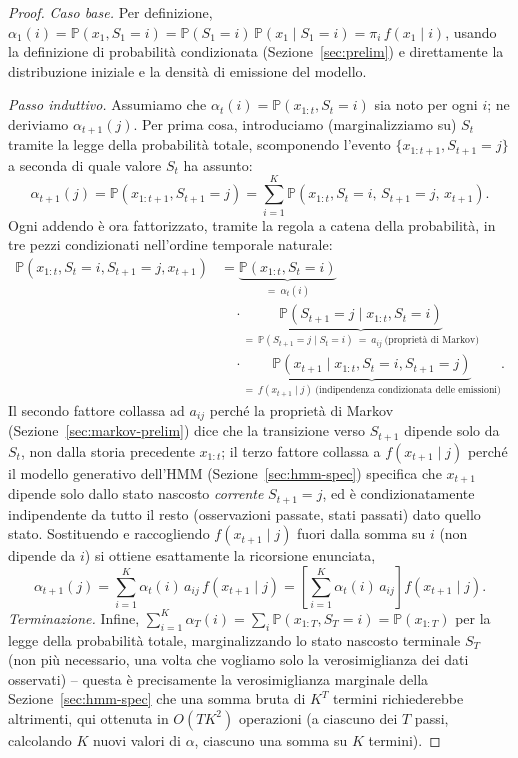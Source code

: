 \documentclass[11pt]{article}
\theoremstyle{definition}
\theoremstyle{remark}
\begin{document}
\begin{proof}
\emph{Caso base.} Per definizione, $\alpha_1(i)=\mathbb{P}(x_1,S_1=i)=\mathbb{P}(S_1=i)\,\mathbb{P}(x_1\mid S_1=i)=\pi_i\,f(x_1\mid i)$, usando la definizione di probabilit\`a condizionata (Sezione~\ref{sec:prelim}) e direttamente la distribuzione iniziale e la densit\`a di emissione del modello.

\emph{Passo induttivo.} Assumiamo che $\alpha_t(i)=\mathbb{P}(x_{1:t},S_t=i)$ sia noto per ogni $i$; ne deriviamo $\alpha_{t+1}(j)$. Per prima cosa, introduciamo (marginalizziamo su) $S_t$ tramite la legge della probabilit\`a totale, scomponendo l'evento $\{x_{1:t+1},S_{t+1}=j\}$ a seconda di quale valore $S_t$ ha assunto:
\[
\alpha_{t+1}(j) = \mathbb{P}(x_{1:t+1},S_{t+1}=j) = \sum_{i=1}^K \mathbb{P}(x_{1:t},S_t=i,\,S_{t+1}=j,\,x_{t+1}).
\]
Ogni addendo \`e ora fattorizzato, tramite la regola a catena della probabilit\`a, in tre pezzi condizionati nell'ordine temporale naturale:
\begin{align*}
\mathbb{P}(x_{1:t},S_t=i,S_{t+1}=j,x_{t+1})
&= \underbrace{\mathbb{P}(x_{1:t},S_t=i)}_{=\ \alpha_t(i)}\\
&\quad\cdot\underbrace{\mathbb{P}(S_{t+1}=j\mid x_{1:t},S_t=i)}_{=\ \mathbb{P}(S_{t+1}=j\mid S_t=i)\ =\ a_{ij}\ \text{(propriet\`a di Markov)}}\\
&\quad\cdot\underbrace{\mathbb{P}(x_{t+1}\mid x_{1:t},S_t=i,S_{t+1}=j)}_{=\ f(x_{t+1}\mid j)\ \text{(indipendenza condizionata delle emissioni)}}.
\end{align*}
Il secondo fattore collassa ad $a_{ij}$ perch\'e la propriet\`a di Markov (Sezione~\ref{sec:markov-prelim}) dice che la transizione verso $S_{t+1}$ dipende solo da $S_t$, non dalla storia precedente $x_{1:t}$; il terzo fattore collassa a $f(x_{t+1}\mid j)$ perch\'e il modello generativo dell'HMM (Sezione~\ref{sec:hmm-spec}) specifica che $x_{t+1}$ dipende solo dallo stato nascosto \emph{corrente} $S_{t+1}=j$, ed \`e condizionatamente indipendente da tutto il resto (osservazioni passate, stati passati) dato quello stato. Sostituendo e raccogliendo $f(x_{t+1}\mid j)$ fuori dalla somma su $i$ (non dipende da $i$) si ottiene esattamente la ricorsione enunciata,
\[
\alpha_{t+1}(j) = \sum_{i=1}^K\alpha_t(i)\,a_{ij}\,f(x_{t+1}\mid j) = \left[\sum_{i=1}^K\alpha_t(i)\,a_{ij}\right]f(x_{t+1}\mid j).
\]
\emph{Terminazione.} Infine, $\sum_{i=1}^K\alpha_T(i)=\sum_i\mathbb{P}(x_{1:T},S_T=i)=\mathbb{P}(x_{1:T})$ per la legge della probabilit\`a totale, marginalizzando lo stato nascosto terminale $S_T$ (non pi\`u necessario, una volta che vogliamo solo la verosimiglianza dei dati osservati) -- questa \`e precisamente la verosimiglianza marginale della Sezione~\ref{sec:hmm-spec} che una somma bruta di $K^T$ termini richiederebbe altrimenti, qui ottenuta in $O(TK^2)$ operazioni (a ciascuno dei $T$ passi, calcolando $K$ nuovi valori di $\alpha$, ciascuno una somma su $K$ termini).
\end{proof}
\end{document}
